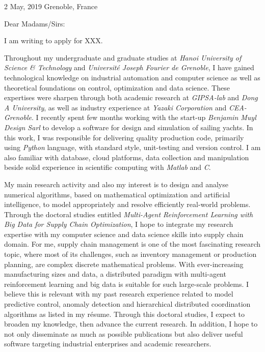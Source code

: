 \documentclass[a4paper,11pt]{article}
\begin{document}
{\hspace*{-\marginparsep minus \marginparwidth}
\begin{minipage}[t]{\textwidth+\marginparwidth+\marginparsep}
	
2 May, 2019 \hfill{Grenoble, France}

\vspace{0.75cm}

Dear Madams/Sirs:

\vspace{0.3cm}

I am writing to apply for XXX. 

\vspace{0.3cm}

Throughout my undergraduate and graduate studies at \emph{Hanoi University of Science \& Technology} and \emph{Universit\'{e} Joseph Fourier de Grenoble}, I have gained technological knowledge on industrial automation and computer science as well as theoretical foundations on control, optimization and data science. These expertises were sharpen through both academic research at \emph{GIPSA-lab} and \emph{Dong A University}, as well as industry experience at \emph{Yazaki Corporation} and \emph{CEA-Grenoble}. I recently spent few months working with the start-up \emph{Benjamin Muyl Design Sarl} to develop a software for design and simulation of sailing yachts. In this work, I was responsible for delivering quality production code, primarily using \emph{Python} language, with standard style, unit-testing and version control. I am also familiar with database, cloud platforms, data collection and manipulation beside solid experience in scientific computing with \emph{Matlab} and \emph{C}. 

\vspace{0.3cm}

My main research activity and also my interest is to design and analyse numerical algorithms, based on mathematical optimization and artificial intelligence, to model appropriately and resolve efficiently real-world problems. Through the doctoral studies entitled \emph{Multi-Agent Reinforcement Learning with Big Data for Supply Chain Optimization}, I hope to integrate my research expertise with my computer science and data science skills into supply chain domain. For me, supply chain management is one of the most fascinating research topic, where most of its challenges, such as inventory management or production planning, are complex discrete mathematical problems. With ever-increasing manufacturing sizes and data, a distributed paradigm with multi-agent reinforcement learning and big data is suitable for such large-scale problems. I believe this is relevant with my past research experience related to model predictive control, anomaly detection and hierarchical distributed coordination algorithms as listed in my r\'{e}sume. Through this doctoral studies, I expect to broaden my knowledge, then advance the current research. In addition, I hope to not only disseminate as much as possible publications but also deliver useful software targeting industrial enterprises and academic researchers.


\end{minipage}}
\end{document}
